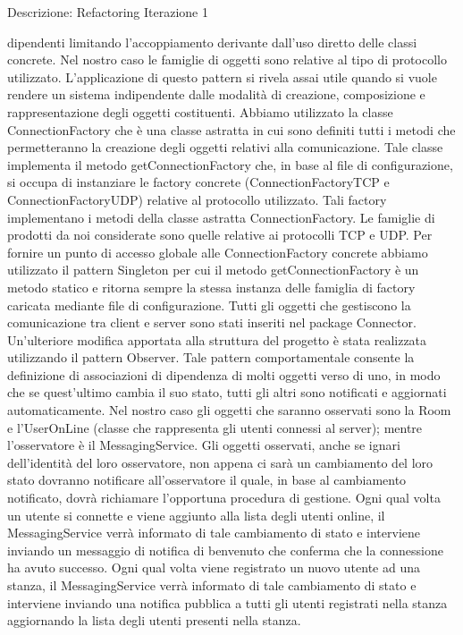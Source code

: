 \begin{frame}[allowframebreaks] {Descrizione: Refactoring Iterazione 1}
\begin{scriptsize}
   dipendenti limitando l'accoppiamento derivante dall'uso diretto delle classi concrete. Nel nostro caso le famiglie di oggetti sono relative al tipo di protocollo 
   utilizzato. L'applicazione di questo pattern si rivela assai utile quando si vuole rendere un sistema indipendente dalle modalità di creazione, composizione e 
   rappresentazione degli oggetti costituenti.
   \newline
   Abbiamo utilizzato la classe ConnectionFactory che è una classe astratta in cui sono definiti tutti i metodi che permetteranno la creazione degli oggetti relativi 
   alla comunicazione. Tale classe implementa il metodo getConnectionFactory che, in base al file di configurazione, si occupa di instanziare le factory concrete    
   (ConnectionFactoryTCP e ConnectionFactoryUDP) relative al protocollo utilizzato. Tali factory implementano i metodi della classe astratta ConnectionFactory. Le 
   famiglie di prodotti da noi considerate sono quelle relative ai protocolli TCP e UDP.
   \newline
   Per  fornire un punto di accesso globale alle ConnectionFactory concrete abbiamo utilizzato il pattern Singleton per cui il metodo getConnectionFactory è un 
   metodo statico e ritorna sempre la stessa instanza delle famiglia di factory caricata mediante file di configurazione. 
   \newline
   Tutti gli oggetti che gestiscono la comunicazione tra client e server sono stati inseriti nel package Connector.
   \newline
   Un'ulteriore modifica apportata alla struttura del progetto è stata realizzata utilizzando il pattern Observer. Tale pattern comportamentale consente la    
   definizione di associazioni di dipendenza di molti oggetti verso di uno, in modo che se quest'ultimo cambia il suo stato, tutti gli altri sono notificati e 
   aggiornati automaticamente. Nel nostro caso gli oggetti che saranno osservati sono la Room e l'UserOnLine (classe che rappresenta gli utenti connessi al server); 
   mentre l'osservatore è il MessagingService.
   \newline
   Gli oggetti osservati, anche se ignari dell'identità del loro osservatore, non appena ci sarà un cambiamento del loro stato dovranno notificare all'osservatore il 
   quale, in base al cambiamento notificato, dovrà richiamare l'opportuna procedura di gestione.
   \newline
   Ogni qual volta un utente si connette e viene aggiunto alla lista degli utenti online, il MessagingService verrà informato di tale cambiamento di stato e 
   interviene inviando un messaggio di notifica di benvenuto che conferma che la connessione ha avuto successo.
   \newline
   Ogni qual volta viene registrato un nuovo utente ad una stanza, il MessagingService verrà informato di tale cambiamento di stato e interviene inviando una 
   notifica pubblica a tutti gli utenti registrati nella stanza aggiornando la lista degli utenti presenti nella stanza.
 \end{scriptsize}
\end{frame}

